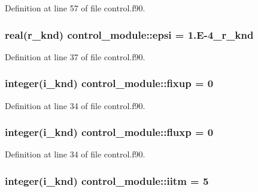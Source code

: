 Definition at line 57 of file control.\-f90.

\hypertarget{classcontrol__module_af1c813926ca0adb64361e5b48a4f73b9}{
\subsubsection[{epsi}]{\setlength{\rightskip}{0pt plus 5cm}real(r\-\_\-knd) control\-\_\-module\-::epsi = 1.\-E-\/4\-\_\-r\-\_\-knd}}\label{classcontrol__module_af1c813926ca0adb64361e5b48a4f73b9}


Definition at line 37 of file control.\-f90.

\hypertarget{classcontrol__module_ad305163b99235b021c5cf0f91e69c6d5}{
\subsubsection[{fixup}]{\setlength{\rightskip}{0pt plus 5cm}integer(i\-\_\-knd) control\-\_\-module\-::fixup = 0}}\label{classcontrol__module_ad305163b99235b021c5cf0f91e69c6d5}


Definition at line 34 of file control.\-f90.

\hypertarget{classcontrol__module_afb6375328be86057f0ac0af554c9abac}{
\subsubsection[{fluxp}]{\setlength{\rightskip}{0pt plus 5cm}integer(i\-\_\-knd) control\-\_\-module\-::fluxp = 0}}\label{classcontrol__module_afb6375328be86057f0ac0af554c9abac}


Definition at line 34 of file control.\-f90.

\hypertarget{classcontrol__module_a668776c82e56b5c08c95f01915287eb2}{
\subsubsection[{iitm}]{\setlength{\rightskip}{0pt plus 5cm}integer(i\-\_\-knd) control\-\_\-module\-::iitm = 5}}\label{classcontrol__module_a668776c82e56b5c08c95f01915287eb2}


